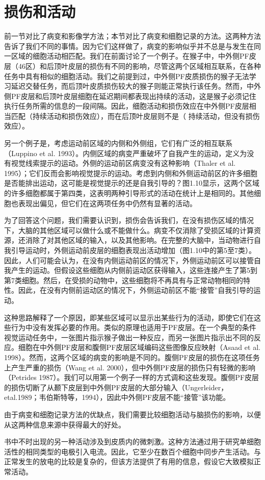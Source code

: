 \section{损伤和活动}
前一节对比了病变和影像学方法；本节对比了病变和细胞记录的方法。这两种方法告诉了我们不同的事情。因为它们这样做了，病变的影响似乎并不总是与发生在同一区域的细胞活动相匹配。我们在前面讨论了一个例子。在猴子中，中外侧PF皮层（46区）和后顶叶皮层的损伤有不同的影响，尽管这两个区域相互联系，在各种任务中具有相似的细胞活动。我们之前提到过，中外侧PF皮质损伤的猴子无法学习延迟交替任务，而后顶叶皮质损伤较大的猴子则能正常执行该任务。然而，中外侧PF皮层和后顶叶皮层细胞在延迟期间都表现出持续的活动，这是猴子必须记住执行任务所需的信息的一段间隔。因此，细胞活动和损伤效应在中外侧PF皮层相当匹配（持续活动和损伤效应），而在后顶叶皮层则不是（ 持续活动，但没有损伤效应）。
\par
另一个例子是，考虑运动前区域的内侧和外侧组，它们有广泛的相互联系（Luppino et al. 1993）。内侧区域的病变严重破坏了自我产生的运动，定义为没有视觉线索提示的运动。外侧的运动前区病变没有这种影响（Thaler et al. 1995）；它们反而会影响视觉提示的运动。考虑到内侧和外侧运动前区的许多细胞是否能排出运动，这可能是视觉提示的还是自我引导的？图1.10显示，这两个区域的许多细胞都属于第四类，这表明两种引导形式的活动在统计上是相同的。其他细胞也表现出偏见，但它们在这两项任务中仍然有显著的活动。
\par
为了回答这个问题，我们需要认识到，损伤会告诉我们，在没有损伤区域的情况下，大脑的其他区域可以做什么或不能做什么。病变不仅消除了受损区域的计算资源，还消除了对其他区域的输入，以及其他影响。在完整的大脑中，当动物进行自我引导运动时，外侧运动前皮层的细胞表现出活动增加（图1.10中的第5至7类）。因此，人们可能会认为，在没有内侧运动前区的情况下，外侧运动前区可以接管自我产生的运动。但假设这些细胞从内侧前运动区获得输入，这些连接产生了第5到第7类细胞。然后，在受损的动物中，这些细胞将不再具有与正常动物相同的特性。因此，在没有内侧前运动区的情况下，外侧运动前区不能“接管”自我引导的运动。
\par
这种思路解释了一个原因，即某些区域可以显示出某些行为的活动，即使它们在这些行为中没有发挥必要的作用。类似的原理也适用于PF皮层。在一个典型的条件视觉运动任务中，一张图片指示猴子做出一种反应，而另一张图片指示出不同的反应。细胞在中外侧PF皮层和腹侧PF皮层区域编码这些图像反应映射（Asaad et al. 1998）。然而，这两个区域的病变的影响是不同的。腹侧PF皮层的损伤在这项任务上产生严重的损伤（Wang et al. 2000），但中外侧PF皮层的损伤只有轻微的影响（Petrides 1987）。我们可以用第一个例子一样的方式调和这些发现。腹侧PF皮层的损伤切断了从颞下皮层到中外侧PF皮层的大部分输入（Ungerleider，etal.1989；韦伯斯特等，1994），因此中外侧PF皮层不能“接管”该功能。
\par
由于病变和细胞记录方法的优缺点，我们需要比较细胞活动与脑损伤的影响，以便从这两种信息来源中获得最大的好处。
\par
书中不时出现的另一种活动涉及到皮质内的微刺激。这种方法通过用于研究单细胞活性的相同类型的电极引入电流。因此，它至少在数百个细胞中同步产生活动。与正常发生的放电的比较是复杂的，但该方法提供了有用的信息，假设它大致模拟正常活动。
